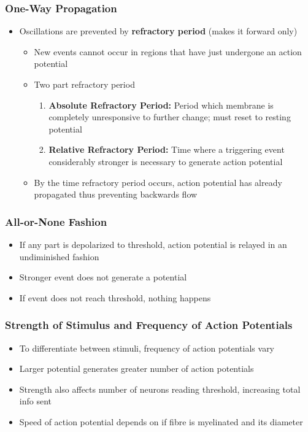 \documentclass[11pt]{article}
\begin{document}
\subsubsection{One-Way Propagation}
\begin{itemize}
\item Oscillations are prevented by \textbf{refractory period} (makes it forward only)
\begin{itemize}
\item New events cannot occur in regions that have just undergone an action potential
\item Two part refractory period
\begin{enumerate}
\item \textbf{Absolute Refractory Period:} Period which membrane is completely unresponsive to further change; must reset to resting potential
\item \textbf{Relative Refractory Period:} Time where a triggering event considerably stronger is necessary to generate action potential
\end{enumerate}
\item By the time refractory period occurs, action potential has already propagated thus preventing backwards flow
\end{itemize}
\end{itemize}

\subsubsection{All-or-None Fashion }
\begin{itemize}
\item If any part is depolarized to threshold, action potential is relayed in an undiminished fashion
\item Stronger event does not generate a potential 
\item If event does not reach threshold, nothing happens
\end{itemize}

\subsubsection{Strength of Stimulus and Frequency of Action Potentials}
\begin{itemize}
\item To differentiate between stimuli, frequency of action potentials vary
\item Larger potential generates greater number of action potentials
\item Strength also affects number of neurons reading threshold, increasing total info sent 
\item Speed of action potential depends on if fibre is myelinated and its diameter
\end{itemize}
\end{document}
